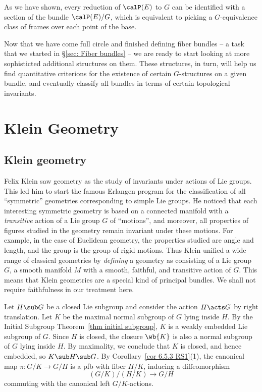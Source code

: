 As we have shown, every reduction of $\calP(E)$ to $G$ can be identified with a section of the bundle $\calP(E)\slash G$, which is equivalent to picking a $G$-equivalence class of frames over each point of the base.


Now that we have come full circle and finished defining fiber bundles -- a task that we started in \S\ref{sec: Fiber bundles} -- we are ready to start looking at more sophisticted additional structures on them. These structures, in turn, will help us find quantitative criterions for the existence of certain $G$-structures on a given bundle, and eventually classify all bundles in terms of certain topological invariants.











\clearpage
\section{Klein Geometry}

\subsection{Klein geometry}

Felix Klein saw geometry as the study of invariants under actions of Lie groups. This led him to start the famous Erlangen program for the classification of all ``symmetric'' geometries corresponding to simple Lie groups. He noticed that each interesting symmetric geometry is based on a connected manifold with a \emph{transitive} action of a Lie group $G$ of ``motions'', and moreover, all properties of figures studied in the geometry remain invariant under these motions. For example, in the case of Euclidean geometry, the properties studied are angle and length, and the group is the group of rigid motions. Thus Klein unified a wide range of classical geometries by \emph{defining} a geometry as consisting of a Lie group $G$, a smooth manifold $M$ with a smooth, faithful, and transitive action of $G$. This means that Klein geometries are a special kind of principal bundles. We shall not require faithfulness in our treatment here.

Let $H\sub G$ be a closed Lie subgroup and consider the action $H\acts G$ by right translation. Let $K$ be the maximal normal subgroup of $G$ lying inside $H$. By the Initial Subgroup Theorem~\ref{thm initial subgroup}, $K$ is a weakly embedded Lie subgroup of $G$. Since $H$ is closed, the closure $\wb{K}$ is also a normal subgroup of $G$ lying inside $H$. By maximality, we conclude that $K$ is closed, and hence embedded, so $K\sub H\sub G$. By Corollary~\ref{cor 6.5.3 RS1}(1), the canonical map $\pi:G\slash K\to G\slash H$ is a \gls{pfb} with fiber $H\slash K$, inducing a diffeomorphism
\[(G\slash K)\slash (H\slash K)\to G\slash H\]
commuting with the canonical left $G\slash K$-actions.


